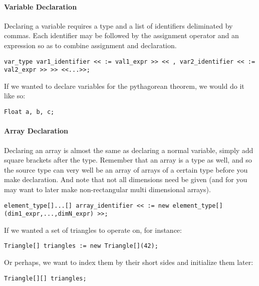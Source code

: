 \paragraph{Variable Declaration}
Declaring a variable requires a type and a list of identifiers deliminated by commas. Each identifier may be followed by the assignment operator and an expression so as to combine assignment and declaration.

\begin{lstlisting}
var_type var1_identifier << := val1_expr >> << , var2_identifier << := val2_expr >> >> <<...>>;
\end{lstlisting}

If we wanted to declare variables for the pythagorean theorem, we would do it like so:

\begin{lstlisting}[caption=Variable Initialization for the Pythagorean Theorem,backgroundcolor=\color{tintedorange}]
Float a, b, c;
\end{lstlisting}

\paragraph{Array Declaration}
Declaring an array is almost the same as declaring a normal variable, simply add square brackets after the type. Remember that an array is a type as well, and so the source type can very well be an array of arrays of a certain type before you make declaration. And note that not all dimensions need be given (and for you may want to later make non-rectangular multi dimensional arrays).

\begin{lstlisting}
element_type[]...[] array_identifier << := new element_type[](dim1_expr,...,dimN_expr) >>;
\end{lstlisting}

If we wanted a set of triangles to operate on, for instance:

\begin{lstlisting}[caption=Array Declaration and Instantiation of Many Triangles, backgroundcolor=\color{tintedorange}]
Triangle[] triangles := new Triangle[](42);
\end{lstlisting}

Or perhaps, we want to index them by their short sides and initialize them later:

\begin{lstlisting}[caption=Array Declaration of a 2-Degree Triangle Array,backgroundcolor=\color{tintedorange}]
Triangle[][] triangles;
\end{lstlisting}

